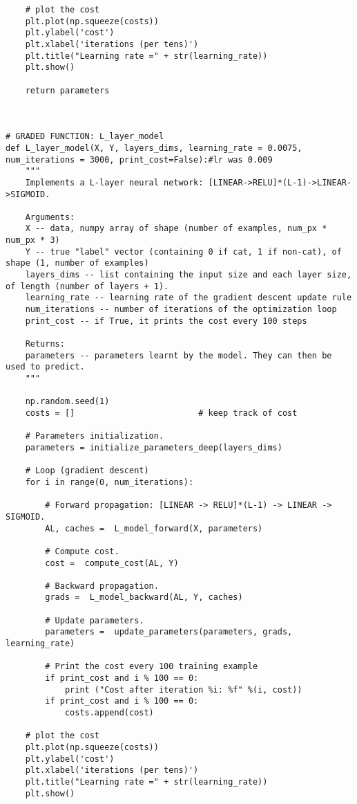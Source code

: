 \begin{verbatim}
    # plot the cost
    plt.plot(np.squeeze(costs))
    plt.ylabel('cost')
    plt.xlabel('iterations (per tens)')
    plt.title("Learning rate =" + str(learning_rate))
    plt.show()
    
    return parameters



# GRADED FUNCTION: L_layer_model
def L_layer_model(X, Y, layers_dims, learning_rate = 0.0075, num_iterations = 3000, print_cost=False):#lr was 0.009
    """
    Implements a L-layer neural network: [LINEAR->RELU]*(L-1)->LINEAR->SIGMOID.
    
    Arguments:
    X -- data, numpy array of shape (number of examples, num_px * num_px * 3)
    Y -- true "label" vector (containing 0 if cat, 1 if non-cat), of shape (1, number of examples)
    layers_dims -- list containing the input size and each layer size, of length (number of layers + 1).
    learning_rate -- learning rate of the gradient descent update rule
    num_iterations -- number of iterations of the optimization loop
    print_cost -- if True, it prints the cost every 100 steps
    
    Returns:
    parameters -- parameters learnt by the model. They can then be used to predict.
    """

    np.random.seed(1)
    costs = []                         # keep track of cost
    
    # Parameters initialization.
    parameters = initialize_parameters_deep(layers_dims)
    
    # Loop (gradient descent)
    for i in range(0, num_iterations):

        # Forward propagation: [LINEAR -> RELU]*(L-1) -> LINEAR -> SIGMOID.
        AL, caches =  L_model_forward(X, parameters)
        
        # Compute cost.
        cost =  compute_cost(AL, Y)
    
        # Backward propagation.
        grads =  L_model_backward(AL, Y, caches)
 
        # Update parameters.
        parameters =  update_parameters(parameters, grads, learning_rate)
                
        # Print the cost every 100 training example
        if print_cost and i % 100 == 0:
            print ("Cost after iteration %i: %f" %(i, cost))
        if print_cost and i % 100 == 0:
            costs.append(cost)
            
    # plot the cost
    plt.plot(np.squeeze(costs))
    plt.ylabel('cost')
    plt.xlabel('iterations (per tens)')
    plt.title("Learning rate =" + str(learning_rate))
    plt.show()
    

\end{verbatim}
